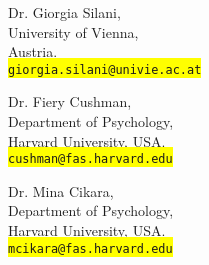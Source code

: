 \documentclass[10pt]{article}
\begin{document}
	\parbox[c]{2.2in}{
	Dr. Giorgia Silani,\\
	University of Vienna,\\
	Austria.\\
	{\tt \colorbox{yellow}{giorgia.silani@univie.ac.at}}
	}
	\parbox[c]{2.2in}{
	Dr. Fiery Cushman,\\
	Department of Psychology,\\
	Harvard University, USA.\\
	{\tt \colorbox{yellow}{cushman@fas.harvard.edu}}
	}
	\parbox[c]{2.2in}{
	Dr. Mina Cikara,\\
	Department of Psychology,\\
	Harvard University, USA.\\
	{\tt \colorbox{yellow}{mcikara@fas.harvard.edu}}
	}
	
	


\end{document}
